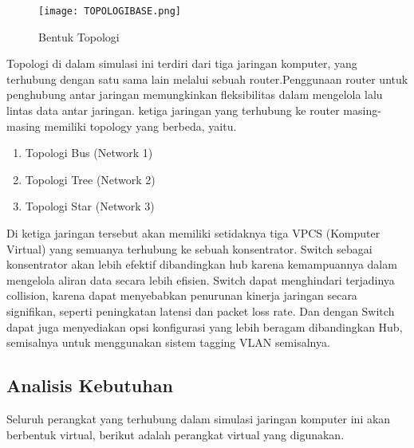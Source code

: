 \documentclass[12pt, a4paper]{article}
\begin{document}
  \begin{figure}[h]
      \centering
      \texttt{[image: TOPOLOGIBASE.png]}
      \caption{\small{Bentuk Topologi}}
  \end{figure}

  Topologi di dalam simulasi ini terdiri dari tiga jaringan komputer,
  yang terhubung dengan satu sama lain melalui sebuah router.Penggunaan router untuk penghubung
  antar jaringan memungkinkan fleksibilitas dalam mengelola lalu
  lintas data antar jaringan. ketiga jaringan yang terhubung ke router masing-masing
  memiliki topology yang berbeda, yaitu.

  \begin{enumerate}
    \item Topologi Bus (Network 1)
    \item Topologi Tree (Network 2)
    \item Topologi Star (Network 3)
  \end{enumerate}

  Di ketiga jaringan tersebut akan memiliki setidaknya tiga
  VPCS (Komputer Virtual) yang semuanya terhubung ke sebuah konsentrator.
  Switch sebagai konsentrator akan lebih efektif dibandingkan hub karena
  kemampuannya dalam mengelola aliran data secara lebih efisien.
  Switch dapat menghindari terjadinya collision, karena dapat menyebabkan
  penurunan kinerja jaringan secara signifikan, seperti peningkatan latensi dan
  packet loss rate. Dan dengan Switch dapat juga menyediakan opsi konfigurasi
  yang lebih beragam dibandingkan Hub, semisalnya untuk menggunakan 
  sistem tagging VLAN semisalnya.


  \subsection{Analisis Kebutuhan}

  Seluruh perangkat yang terhubung dalam simulasi jaringan komputer ini akan
  berbentuk virtual, berikut adalah perangkat virtual yang digunakan.
\end{document}
